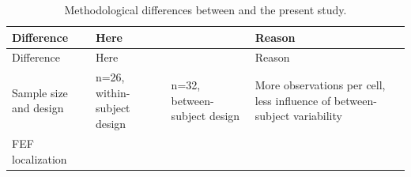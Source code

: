 \documentclass[11pt,english,]{memoir}
\begin{document}
\begin{longtable}[]{@{}llll@{}}
\caption{\label{tab:differences} Methodological differences between \textcite{Kanai2012} and the present study.}\tabularnewline
\toprule
\begin{minipage}[b]{0.14\columnwidth}\raggedright
Difference\strut
\end{minipage} & \begin{minipage}[b]{0.21\columnwidth}\raggedright
Here\strut
\end{minipage} & \begin{minipage}[b]{0.16\columnwidth}\raggedright
\textcite{Kanai2012}\strut
\end{minipage} & \begin{minipage}[b]{0.38\columnwidth}\raggedright
Reason\strut
\end{minipage}\tabularnewline
\midrule
\endfirsthead
\toprule
\begin{minipage}[b]{0.14\columnwidth}\raggedright
Difference\strut
\end{minipage} & \begin{minipage}[b]{0.21\columnwidth}\raggedright
Here\strut
\end{minipage} & \begin{minipage}[b]{0.16\columnwidth}\raggedright
\textcite{Kanai2012}\strut
\end{minipage} & \begin{minipage}[b]{0.38\columnwidth}\raggedright
Reason\strut
\end{minipage}\tabularnewline
\midrule
\endhead
\begin{minipage}[t]{0.14\columnwidth}\raggedright
Sample size and design\strut
\end{minipage} & \begin{minipage}[t]{0.21\columnwidth}\raggedright
n=26, within-subject design\strut
\end{minipage} & \begin{minipage}[t]{0.16\columnwidth}\raggedright
n=32, between-subject design\strut
\end{minipage} & \begin{minipage}[t]{0.38\columnwidth}\raggedright
More observations per cell, less influence of between-subject variability\strut
\end{minipage}\tabularnewline
\begin{minipage}[t]{0.14\columnwidth}\raggedright
FEF localization\strut
\end{minipage} & \begin{minipage}[t]{0.21\columnwidth}\raggedright

\end{minipage}
\end{longtable}
\end{document}

